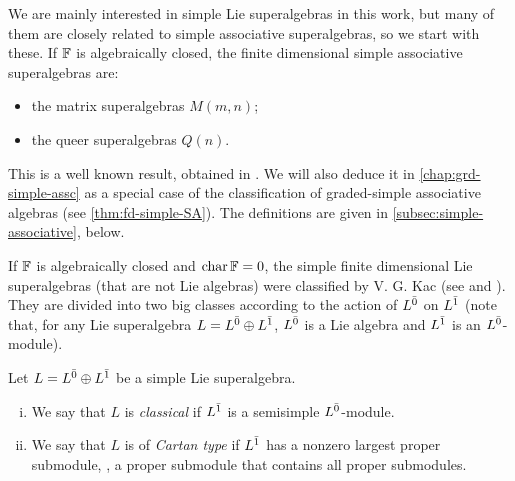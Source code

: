 

We are mainly interested in simple Lie superalgebras in this work, but many of them are closely related to simple associative superalgebras, so we start with these. 
If $\mathbb{F}$ is algebraically closed, the finite dimensional simple associative superalgebras are:
%
\begin{itemize}
    \item the matrix superalgebras $M(m,n)$;
    
    \item the queer superalgebras $Q(n)$.
\end{itemize}

This is a well known result, obtained in \cite{MR167498}. 
We will also deduce it in \cref{chap:grd-simple-assc} as a special case of the classification of graded-simple associative algebras (see \cref{thm:fd-simple-SA}). 
The definitions are given in \cref{subsec:simple-associative}, below. 

If $\mathbb{F}$ is algebraically closed and $\operatorname{char} \mathbb{F} = 0$, 
the simple finite dimensional Lie superalgebras (that are not Lie algebras) were classified by V. G. Kac (see \cite{artigokac} and \cite{livrosuperalgebra}). 
They are divided into two big classes according to the action of $L^{\bar0}$ on $L^{\bar1}$ (note that, for any Lie superalgebra $L=L^{\bar0} \oplus L^{\bar1}$, $L^{\bar0}$ is a Lie algebra and $L^{\bar1}$ is an $L^{\bar0}$-module). 

\begin{defi}
	Let $L=L^{\bar0} \oplus L^{\bar1}$ be a simple Lie superalgebra.
	\begin{enumerate}[(i)]
		\item We say that $L$ is \emph{classical} if $L^{\bar1}$ is a semisimple $L^{\bar0}$-module.
		\item We say that $L$ is of \emph{Cartan type} if $L^{\bar1}$ has a nonzero largest proper submodule, \ie, a proper submodule that contains all proper submodules.
	\end{enumerate}
\end{defi}


